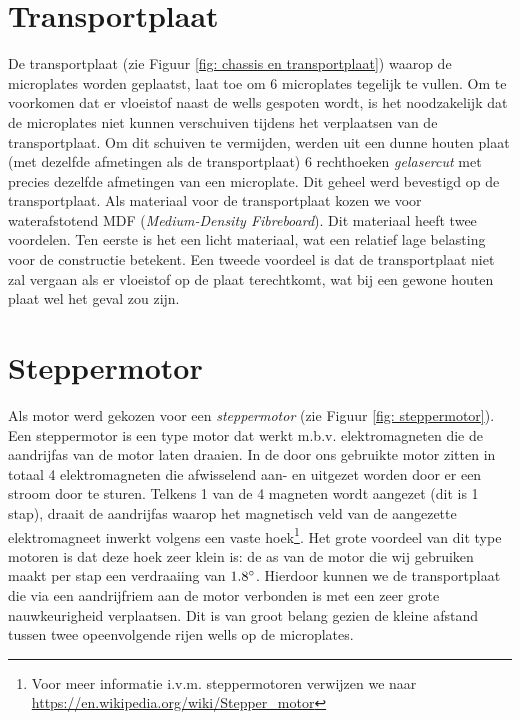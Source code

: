 \documentclass[a4paper,twoside,kulak]{kulakreport} %
\begin{document}
\section{Transportplaat}

De transportplaat (zie Figuur \ref{fig: chassis en transportplaat}) waarop de microplates worden geplaatst, laat toe om 6 microplates tegelijk te vullen. Om te voorkomen dat er vloeistof naast de wells gespoten wordt, is het noodzakelijk dat de microplates niet kunnen verschuiven tijdens het verplaatsen van de transportplaat. Om dit schuiven te vermijden, werden uit een dunne houten plaat (met dezelfde afmetingen als de transportplaat) 6 rechthoeken \textit{gelasercut} met precies dezelfde afmetingen van een microplate. Dit geheel werd bevestigd op de transportplaat. Als materiaal voor de transportplaat kozen we voor waterafstotend MDF (\textit{Medium-Density Fibreboard}). Dit materiaal heeft twee voordelen. Ten eerste is het een licht materiaal, wat een relatief lage belasting voor de constructie betekent. Een tweede voordeel is dat de transportplaat niet zal vergaan als er vloeistof op de plaat terechtkomt, wat bij een gewone houten plaat wel het geval zou zijn. 


\section{Steppermotor}

Als motor werd gekozen voor een \textit{steppermotor} (zie Figuur \ref{fig: steppermotor}). Een steppermotor is een type motor dat werkt m.b.v. elektromagneten die de aandrijfas van de motor laten draaien. In de door ons gebruikte motor zitten in totaal 4 elektromagneten die afwisselend aan- en uitgezet worden door er een stroom door te sturen. Telkens 1 van de 4 magneten wordt aangezet (dit is 1 stap), draait de aandrijfas waarop het magnetisch veld van de aangezette elektromagneet inwerkt volgens een vaste hoek\footnote{Voor meer informatie i.v.m. steppermotoren verwijzen we naar \url{https://en.wikipedia.org/wiki/Stepper_motor}}. Het grote voordeel van dit type motoren is dat deze hoek zeer klein is: de as van de motor die wij gebruiken maakt per stap een verdraaiing van $1.8\degree$. Hierdoor kunnen we de transportplaat die via een aandrijfriem aan de motor verbonden is met een zeer grote nauwkeurigheid verplaatsen. Dit is van groot belang gezien de kleine afstand tussen twee opeenvolgende rijen wells op de microplates. 
\end{document}
